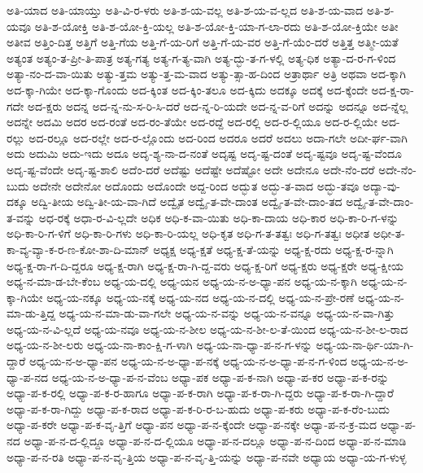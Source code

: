 {ಅತಿ-ಯಾದ
ಅತಿ-ಯಾಯ್ತು
ಅತಿ-ವಿ-ರ-ಳರು
ಅತಿ-ಶ-ಯ-ವಲ್ಲ
ಅತಿ-ಶ-ಯ-ವ-ಲ್ಲದ
ಅತಿ-ಶ-ಯ-ವಾದ
ಅತಿ-ಶ-ಯವೂ
ಅತಿ-ಶ-ಯೋಕ್ತಿ
ಅತಿ-ಶ-ಯೋ-ಕ್ತಿ-ಯಲ್ಲ
ಅತಿ-ಶ-ಯೋ-ಕ್ತಿ-ಯಾ-ಗ-ಲಾ-ರದು
ಅತಿ-ಶ-ಯೋ-ಕ್ತಿಯೇ
ಅತೀ
ಅತೀವ
ಅತ್ತಿಂ-ದಿತ್ತ
ಅತ್ತಿಗೆ
ಅತ್ತಿ-ಗೆಯ
ಅತ್ತಿ-ಗೆ-ಯ-ರಿಗೆ
ಅತ್ತಿ-ಗೆ-ಯ-ವರ
ಅತ್ತಿ-ಗೆ-ಯೆಂ-ದರೆ
ಅತ್ತಿತ್ತ
ಅತ್ಮೀ-ಯತೆ
ಅತ್ಯಂತ
ಅತ್ಯಂ-ತ-ಪ್ರೀ-ತಿ-ಪಾತ್ರ
ಅತ್ಯ-ಗತ್ಯ
ಅತ್ಯ-ಗ-ತ್ಯ-ವಾಗಿ
ಅತ್ಯ-ದ್ಭು-ತ-ಗ-ಳಲ್ಲಿ
ಅತ್ಯ-ಧಿಕ
ಅತ್ಯಾ-ದ-ರ-ಗ-ಳಿಂದ
ಅತ್ಯಾ-ನಂ-ದ-ವಾ-ಯಿತು
ಅತ್ಯು-ತ್ತಮ
ಅತ್ಯು-ತ್ತ-ಮ-ವಾದ
ಅತ್ಯು-ತ್ಸಾ-ಹ-ದಿಂದ
ಅತ್ರಾರ್ಥಾ
ಅತ್ರಿ
ಅಥವಾ
ಅದ-ಕ್ಕಾಗಿ
ಅದ-ಕ್ಕಾ-ಗಿಯೇ
ಅದ-ಕ್ಕಾ-ಗೊಂದು
ಅದ-ಕ್ಕಿಂತ
ಅದ-ಕ್ಕಿಂ-ತಲೂ
ಅದ-ಕ್ಕಿದು
ಅದಕ್ಕೂ
ಅದಕ್ಕೆ
ಅದ-ಕ್ಕೆಂದೇ
ಅದ-ಕ್ಷ-ರಾ-ಗದೇ
ಅದ-ಕ್ಷರು
ಅದನ್ನ
ಅದ-ನ್ನ-ನು-ಸ-ರಿ-ಸಿ-ದರೆ
ಅದ-ನ್ನ-ರಿ-ಯದೇ
ಅದ-ನ್ನ-ವ-ರಿಗೆ
ಅದನ್ನು
ಅದನ್ನೂ
ಅದ-ನ್ನೆಲ್ಲ
ಅದನ್ನೇ
ಅದಮಿ
ಅದರ
ಅದ-ರಂತೆ
ಅದ-ರಂ-ತೆಯೇ
ಅದ-ರದ್ದೆ
ಅದ-ರಲ್ಲಿ
ಅದ-ರ-ಲ್ಲಿಯೂ
ಅದ-ರ-ಲ್ಲಿಯೇ
ಅದ-ರಲ್ಲು
ಅದ-ರಲ್ಲೂ
ಅದ-ರಲ್ಲೇ
ಅದ-ರ-ಲ್ಲೊಂದು
ಅದ-ರಿಂದ
ಅದರೂ
ಅದರೆ
ಅದಲು
ಅದಾ-ಗಲೇ
ಅದೀ-ರ್ಘ-ವಾಗಿ
ಅದು
ಅದುಮಿ
ಅದು-ಇದು
ಅದೂ
ಅದೃ-ಶ್ಯ-ನಾ-ದ-ನಂತೆ
ಅದೃಷ್ಟ
ಅದೃ-ಷ್ಟ-ದಂತೆ
ಅದೃ-ಷ್ಟವೂ
ಅದೃ-ಷ್ಟ-ವೆಂದೂ
ಅದೃ-ಷ್ಟ-ವೆಂದೇ
ಅದೃ-ಷ್ಟ-ಶಾಲಿ
ಅದೆಂ-ದರೆ
ಅದೆಷ್ಟು
ಅದೆಷ್ಟೇ
ಅದೆಷ್ಟೋ
ಅದೇ
ಅದೇನೂ
ಅದೇ-ನೆಂ-ದರೆ
ಅದೇ-ನೆಂ-ಬುದು
ಅದೇನೇ
ಅದೇನೋ
ಅದೊಂದು
ಅದೊಂದೇ
ಅದ್ದ-ರಿಂದ
ಅದ್ಭುತ
ಅದ್ಭು-ತ-ವಾದ
ಅದ್ಭು-ತವೂ
ಅದ್ಯಾ-ವು-ದಕ್ಕೂ
ಅದ್ವಿ-ತೀಯ
ಅದ್ವಿ-ತೀ-ಯ-ವಾ-ಗಿದೆ
ಅದ್ವೈತ
ಅದ್ವೈ-ತ-ವೇ-ದಾಂತ
ಅದ್ವೈ-ತ-ವೇ-ದಾಂ-ತದ
ಅದ್ವೈ-ತ-ವೇ-ದಾಂ-ತ-ವನ್ನು
ಅಧ-ರಕ್ಕೆ
ಅಧಾ-ರ-ವಿ-ಲ್ಲದೇ
ಅಧಿಕ
ಅಧಿ-ಕ-ವಾ-ಯಿತು
ಅಧಿ-ಕಾ-ದಾಯ
ಅಧಿ-ಕಾರ
ಅಧಿ-ಕಾ-ರಿ-ಗ-ಳನ್ನು
ಅಧಿ-ಕಾ-ರಿ-ಗ-ಳಿಗೆ
ಅಧಿ-ಕಾ-ರಿ-ಗಳು
ಅಧಿ-ಕಾ-ರಿ-ಯಲ್ಲ
ಅಧಿ-ಕೃತ
ಅಧಿ-ಗ-ತ-ತತ್ವಃ
ಅಧಿ-ಗ-ತತ್ವಃ
ಅಧೀತ
ಅಧೀ-ತ-ಕಾ-ವ್ಯ-ವ್ಯಾ-ಕ-ರ-ಣ-ಕೋ-ಶಾ-ದಿ-ಮಾನ್
ಅಧ್ಯಕ್ಷ
ಅಧ್ಯ-ಕ್ಷತೆ
ಅಧ್ಯ-ಕ್ಷ-ತೆ-ಯನ್ನು
ಅಧ್ಯ-ಕ್ಷ-ರದು
ಅಧ್ಯ-ಕ್ಷ-ರ-ನ್ನಾಗಿ
ಅಧ್ಯ-ಕ್ಷ-ರಾ-ಗ-ದಿ-ದ್ದರೂ
ಅಧ್ಯ-ಕ್ಷ-ರಾಗಿ
ಅಧ್ಯ-ಕ್ಷ-ರಾ-ಗಿ-ದ್ದ-ವರು
ಅಧ್ಯ-ಕ್ಷ-ರಿಗೆ
ಅಧ್ಯ-ಕ್ಷರು
ಅಧ್ಯ-ಕ್ಷರೇ
ಅಧ್ಯ-ಕ್ಷೀಯ
ಅಧ್ಯ-ನ-ಮಾ-ಡ-ಬೇ-ಕೆಂಬ
ಅಧ್ಯ-ಯ-ದಲ್ಲಿ
ಅಧ್ಯ-ಯನ
ಅಧ್ಯ-ಯ-ನ-ಅ-ಧ್ಯಾ-ಪನ
ಅಧ್ಯ-ಯ-ನ-ಕ್ಕಾಗಿ
ಅಧ್ಯ-ಯ-ನ-ಕ್ಕಾ-ಗಿಯೇ
ಅಧ್ಯ-ಯ-ನಕ್ಕೂ
ಅಧ್ಯ-ಯ-ನಕ್ಕೆ
ಅಧ್ಯ-ಯ-ನದ
ಅಧ್ಯ-ಯ-ನ-ದಲ್ಲಿ
ಅಧ್ಯ-ಯ-ನ-ಪ್ರೇ-ರಣೆ
ಅಧ್ಯ-ಯ-ನ-ಮಾ-ಡು-ತ್ತಿದ್ದ
ಅಧ್ಯ-ಯ-ನ-ಮಾ-ಡು-ವಾ-ಗಲೇ
ಅಧ್ಯ-ಯ-ನ-ವನ್ನು
ಅಧ್ಯ-ಯ-ನ-ವನ್ನೂ
ಅಧ್ಯ-ಯ-ನ-ವಾ-ಗಿತ್ತು
ಅಧ್ಯ-ಯ-ನ-ವಿ-ಲ್ಲದೆ
ಅಧ್ಯ-ಯ-ನವೂ
ಅಧ್ಯ-ಯ-ನ-ಶೀಲ
ಅಧ್ಯ-ಯ-ನ-ಶೀ-ಲ-ತೆ-ಯಿಂದ
ಅಧ್ಯ-ಯ-ನ-ಶೀ-ಲ-ರಾದ
ಅಧ್ಯ-ಯ-ನ-ಶೀ-ಲರು
ಅಧ್ಯ-ಯ-ನಾ-ಕಾಂ-ಕ್ಷಿ-ಗ-ಳಾಗಿ
ಅಧ್ಯ-ಯ-ನಾ-ಧ್ಯಾ-ಪ-ನ-ಗ-ಳನ್ನು
ಅಧ್ಯ-ಯ-ನಾ-ರ್ಥಿ-ಯಾ-ಗಿ-ದ್ದಾರೆ
ಅಧ್ಯ-ಯ-ನ-ಅ-ಧ್ಯಾ-ಪನ
ಅಧ್ಯ-ಯ-ನ-ಅ-ಧ್ಯಾ-ಪ-ನಕ್ಕೆ
ಅಧ್ಯ-ಯ-ನ-ಅ-ಧ್ಯಾ-ಪ-ನ-ಗ-ಳಿಂದ
ಅಧ್ಯ-ಯ-ನ-ಅ-ಧ್ಯಾ-ಪ-ನದ
ಅಧ್ಯ-ಯ-ನ-ಅ-ಧ್ಯಾ-ಪ-ನ-ವೆಂಬ
ಅಧ್ಯಾ-ಪಕ
ಅಧ್ಯಾ-ಪ-ಕ-ನಾಗಿ
ಅಧ್ಯಾ-ಪ-ಕರ
ಅಧ್ಯಾ-ಪ-ಕ-ರನ್ನು
ಅಧ್ಯಾ-ಪ-ಕ-ರಲ್ಲಿ
ಅಧ್ಯಾ-ಪ-ಕ-ರ-ಹಾಗೂ
ಅಧ್ಯಾ-ಪ-ಕ-ರಾಗಿ
ಅಧ್ಯಾ-ಪ-ಕ-ರಾ-ಗಿ-ದ್ದರು
ಅಧ್ಯಾ-ಪ-ಕ-ರಾ-ಗಿ-ದ್ದಾರೆ
ಅಧ್ಯಾ-ಪ-ಕ-ರಾ-ಗಿದ್ದು
ಅಧ್ಯಾ-ಪ-ಕ-ರಾದ
ಅಧ್ಯಾ-ಪ-ಕ-ರಿ-ರ-ಬ-ಹುದು
ಅಧ್ಯಾ-ಪ-ಕರು
ಅಧ್ಯಾ-ಪ-ಕ-ರೆಂ-ಬುದು
ಅಧ್ಯಾ-ಪ-ಕರೇ
ಅಧ್ಯಾ-ಪ-ಕ-ವೃ-ತ್ತಿಗೆ
ಅಧ್ಯಾ-ಪನ
ಅಧ್ಯಾ-ಪ-ನ-ಕ್ಕೆಂದೇ
ಅಧ್ಯಾ-ಪ-ನಕ್ಕೇ
ಅಧ್ಯಾ-ಪ-ನ-ಕ್ರ-ಮದ
ಅಧ್ಯಾ-ಪ-ನದ
ಅಧ್ಯಾ-ಪ-ನ-ದ-ಲ್ಲಿದ್ದೂ
ಅಧ್ಯಾ-ಪ-ನ-ದ-ಲ್ಲಿಯೂ
ಅಧ್ಯಾ-ಪ-ನ-ದಲ್ಲೂ
ಅಧ್ಯಾ-ಪ-ನ-ದಿಂದ
ಅಧ್ಯಾ-ಪ-ನ-ಮಾಡಿ
ಅಧ್ಯಾ-ಪ-ನ-ರತಿ
ಅಧ್ಯಾ-ಪ-ನ-ವೃ-ತ್ತಿಯ
ಅಧ್ಯಾ-ಪ-ನ-ವೃ-ತ್ತಿ-ಯನ್ನು
ಅಧ್ಯಾ-ಪ-ನವೇ
ಅಧ್ಯಾಯ
ಅಧ್ಯಾ-ಯ-ಗ-ಳುಳ್ಳ
}
